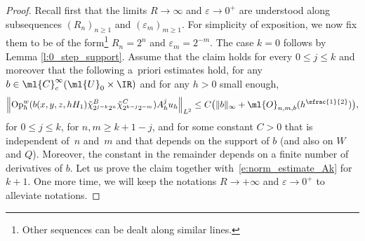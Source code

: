 \documentclass[JEP,XML,SOM,Unicode, NoEqCountersInSection,published]{cedram}
\theoremstyle{plain}
\theoremstyle{definition}
\theoremstyle{remark}
\newcommand{\Op}{\operatorname{Op}}
\begin{document}
\begin{proof}
Recall first that the limits $R\to\infty$ and $\varepsilon\to 0^+$ are understood along subsequences $(R_n)_{n\geq 1}$ and $(\varepsilon_m)_{m\geq 1}$. For simplicity of exposition, we now fix them to be of the form\footnote{Other sequences can be dealt along similar lines.} $R_n=2^n$ and $\varepsilon_m=2^{-m}$. The case $k = 0$ follows by Lemma \ref{l:0_step_support}. Assume that the claim holds for every $0\leq j\leq k$ and moreover that the following a~priori estimates hold, for any $b\in\ml{C}^{\infty}_c(\ml{U}_0\times\IR)$ and for any $h>0$ small enough,
\begin{equation}
\label{e:norm_estimate_Ak}
\left\| \Op_h^w(b(x,y,z,hH_1)\tilde{\chi}_{2^{j-k}2^n}^B\tilde{\chi}_{2^{ k-j}2^{-m}}^C)A^j_h u_h \right\|_{L^2} \leq C\bigl(\|b\|_\infty+\ml{O}_{n,m,b}(h^{\sfrac{1}{2}})\bigr),
\end{equation}
for $0 \leq j \leq k$, for $n,m \geq k+1 - j$, and for some constant $C>0$ that is independent of~$n$ and~$m$ and that depends on the support of $b$ (and also on $W$ and $Q$). Moreover, the constant in the remainder depends on a finite number of derivatives of $b$. Let us prove the claim together with~\eqref{e:norm_estimate_Ak} for $k+1$. One more time, we will keep the notations $R\to+\infty$ and $\varepsilon\to 0^+$ to alleviate notations.


\end{proof}
\end{document}

